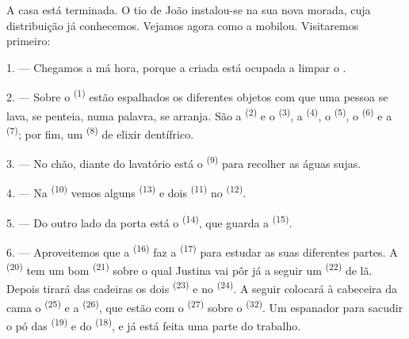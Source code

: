 %

\VUsaut{6.0mm}
\VUsaut{1.4mm}
\VUsaut{0.4mm}
\VUsaut{2.2mm}

A casa está terminada. O tio de João instalou-se na sua nova morada,
cuja distribuição já conhecemos. Vejamos agora como a mobilou.
Visitaremos primeiro:

\VUsaut{3.0mm}

1. --- Chegamos a má hora, porque a criada está ocupada a limpar o
.

2. --- Sobre o  \textsuperscript{(1)} estão espalhados os
diferentes objetos com que uma pessoa se lava, se penteia, numa palavra,
se arranja. São a  \textsuperscript{(2)} e o 
\textsuperscript{(3)}, a  \textsuperscript{(4)}, o
 \textsuperscript{(5)}, o  \textsuperscript{(6)} e a
 \textsuperscript{(7)}; por fim, um 
\textsuperscript{(8)} de elixir dentífrico.

3. --- No chão, diante do lavatório está o  \textsuperscript{(9)}
para recolher as águas sujas.

4. --- Na  \textsuperscript{(10)} vemos alguns 
\textsuperscript{(13)} e dois  \textsuperscript{(11)} no
 \textsuperscript{(12)}.

5. --- Do outro lado da porta está o 
\textsuperscript{(14)}, que guarda a  \textsuperscript{(15)}.

6. --- Aproveitemos que a  \textsuperscript{(16)} faz a
 \textsuperscript{(17)} para estudar as suas diferentes partes. A
 \textsuperscript{(20)} tem um bom 
\textsuperscript{(21)} sobre o qual Justina vai pôr já a seguir um
 \textsuperscript{(22)} de lã. Depois tirará das cadeiras os
dois  \textsuperscript{(23)} e no 
\textsuperscript{(24)}. A seguir colocará à cabeceira da cama o
 \textsuperscript{(25)} e a 
\textsuperscript{(26)}, que estão com o  \textsuperscript{(27)} sobre o
 \textsuperscript{(32)}. Um espanador para sacudir o pó
das  \textsuperscript{(19)} e do 
\textsuperscript{(18)}, e já está feita uma parte do trabalho.

